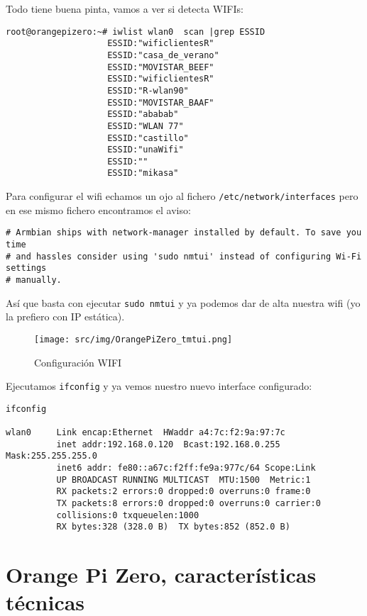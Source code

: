 \documentclass[12pt,spanish,]{scrartcl}
\begin{document}
Todo tiene buena pinta, vamos a ver si detecta WIFIs:

\begin{verbatim}
root@orangepizero:~# iwlist wlan0  scan |grep ESSID
                    ESSID:"wificlientesR"
                    ESSID:"casa_de_verano"
                    ESSID:"MOVISTAR_BEEF"
                    ESSID:"wificlientesR"
                    ESSID:"R-wlan90"
                    ESSID:"MOVISTAR_BAAF"
                    ESSID:"ababab"
                    ESSID:"WLAN 77"
                    ESSID:"castillo"
                    ESSID:"unaWifi"
                    ESSID:""
                    ESSID:"mikasa"
\end{verbatim}

Para configurar el wifi echamos un ojo al fichero
\texttt{/etc/network/interfaces} pero en ese mismo fichero encontramos
el aviso:

\begin{verbatim}
# Armbian ships with network-manager installed by default. To save you time
# and hassles consider using 'sudo nmtui' instead of configuring Wi-Fi settings
# manually.
\end{verbatim}

Así que basta con ejecutar \texttt{sudo\ nmtui} y ya podemos dar de alta
nuestra wifi (yo la prefiero con IP estática).

\begin{figure}
\centering
\texttt{[image: src/img/OrangePiZero\_tmtui.png]}
\caption{Configuración WIFI}
\end{figure}

Ejecutamos \texttt{ifconfig} y ya vemos nuestro nuevo interface
configurado:

\begin{verbatim}
ifconfig

wlan0     Link encap:Ethernet  HWaddr a4:7c:f2:9a:97:7c
          inet addr:192.168.0.120  Bcast:192.168.0.255  Mask:255.255.255.0
          inet6 addr: fe80::a67c:f2ff:fe9a:977c/64 Scope:Link
          UP BROADCAST RUNNING MULTICAST  MTU:1500  Metric:1
          RX packets:2 errors:0 dropped:0 overruns:0 frame:0
          TX packets:8 errors:0 dropped:0 overruns:0 carrier:0
          collisions:0 txqueuelen:1000
          RX bytes:328 (328.0 B)  TX bytes:852 (852.0 B)
\end{verbatim}

\hypertarget{orange-pi-zero-caracteruxedsticas-tuxe9cnicas}{%
\section{Orange Pi Zero, características
técnicas}\label{orange-pi-zero-caracteruxedsticas-tuxe9cnicas}}
\end{document}
